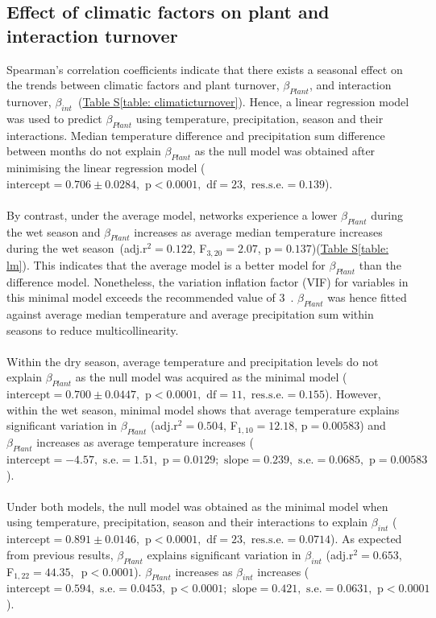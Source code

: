 \documentclass[11pt]{article}
\begin{document}
\vspace{0.5cm}
\subsection{Effect of climatic factors on plant and interaction turnover}
\label{subsec: climate}
Spearman's correlation coefficients indicate that there exists a seasonal effect on the trends between climatic factors and plant turnover, $\beta_{Plant}$, and interaction turnover, $\beta_{int}$~(\hyperref[table: climaticturnover]{Table S\ref{table: climaticturnover}}). Hence, a linear regression model was used to predict $\beta_{Plant}$ using temperature, precipitation, season and their interactions. Median temperature difference and precipitation sum difference between months do not explain $\beta_{Plant}$ as the null model was obtained after minimising the linear regression model ($\text{intercept}=0.706\pm0.0284, \text{ p}<0.0001, \text{ df}=23, \text{ res.s.e.}=0.139$). \\
\\
By contrast, under the average model, networks experience a lower $\beta_{Plant}$ during the wet season and $\beta_{Plant}$ increases as average median temperature increases during the wet season~(adj.r$^{2}=0.122$, F$_{3,20}=2.07$, $\text{p}=0.137$)(\hyperref[table: lm]{Table S\ref{table: lm}}). This indicates that the average model is a better model for $\beta_{Plant}$ than the difference model. Nonetheless, the variation inflation factor (VIF) for variables in this minimal model exceeds the recommended value of 3~\citep{Zuur2010}. $\beta_{Plant}$ was hence fitted against average median temperature and average precipitation sum within seasons to reduce multicollinearity. \\
\\
Within the dry season, average temperature and precipitation levels do not explain $\beta_{Plant}$ as the null model was acquired as the minimal model ($\text{intercept}=0.700\pm0.0447, \text{ p}<0.0001, \text{ df}=11, \text{ res.s.e.}=0.155$). However, within the wet season, minimal model shows that average temperature explains significant variation in $\beta_{Plant}$ (adj.r$^{2}=0.504$, F$_{1,10}=12.18$, $\text{p}= 0.00583$) and $\beta_{Plant}$ increases as average temperature increases ($\text{intercept}=-4.57, \text{ s.e.}=1.51, \text{ p}=0.0129; \text{ slope}= 0.239, \text{ s.e.}=0.0685, \text{ p}=0.00583$). \\
\\
Under both models, the null model was obtained as the minimal model when using temperature, precipitation, season and their interactions to explain $\beta_{int}$ ($\text{intercept}=0.891\pm0.0146, \text{ p}<0.0001, \text{ df}=23, \text{ res.s.e.}=0.0714$). As expected from previous results, $\beta_{Plant}$ explains significant variation in $\beta_{int}$ (adj.r$^{2}=0.653$, F$_{1,22}=44.35$, $\text{ p}<0.0001$). $\beta_{Plant}$ increases as $\beta_{int}$ increases ($\text{intercept}=0.594, \text{ s.e.}=0.0453, \text{ p}<0.0001; \text{ slope}=0.421, \text{ s.e.}=0.0631, \text{ p}<0.0001$). \\
\end{document}
